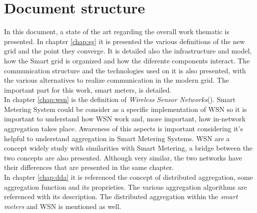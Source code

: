 \section{Document structure}\label{s:struct}
In this document, a state of the art regarding the overall work thematic is presented. In chapter \ref{chap:sg} it is presented the various definitions of the new grid and the point they converge. It is detailed also the infrastructure and model, how the Smart grid is organized and how the diferente components interact.  The communication structure and the technologies used on it is also presented, with the various alternatives to realize communication in the modern grid. The important part for this work, smart meters, is detailed.\\
In chapter \ref{chap:wsn} is the definition of \textit{Wireless Sensor Networks}(). Smart Metering System could be consider as a specific implementation of WSN so it is important to understand how WSN work and, more important, how in-network aggregation takes place. Awareness of this aspects is important considering it's helpful to understand aggregation in Smart Metering Systems. WSN are a concept widely study with similarities with Smart Metering, a bridge between the two concepts are also presented. Although very similar,  the two networks have their differences that are presented in the same chapter.\\
In chapter \ref{chap:dda} it is referenced the concept of distributed aggregation, some aggregation function and its proprieties.  The various aggregation algorithms are referenced with its description. The distributed aggregation within  the \textit{smart meters} and WSN is mentioned as well.


